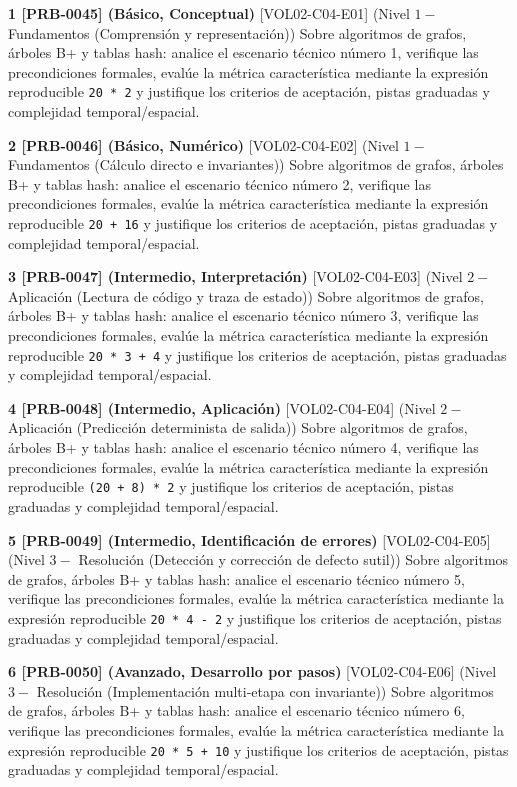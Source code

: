 \documentclass{book}
\begin{document}
\begin{tcolorbox}[title={Ejercicios}, studiumworked, breakable]

\noindent\textbf{1 [PRB-0045] (Básico, Conceptual)}
[VOL02-C04-E01] (Nivel \(1 -\) Fundamentos (Comprensión y representación)) Sobre algoritmos de grafos, árboles B+ y tablas hash: analice el escenario técnico número 1, verifique las precondiciones formales, evalúe la métrica característica mediante la expresión reproducible \texttt{20 * 2} y justifique los criterios de aceptación, pistas graduadas y complejidad temporal/espacial.

\noindent\textbf{2 [PRB-0046] (Básico, Numérico)}
[VOL02-C04-E02] (Nivel \(1 -\) Fundamentos (Cálculo directo e invariantes)) Sobre algoritmos de grafos, árboles B+ y tablas hash: analice el escenario técnico número 2, verifique las precondiciones formales, evalúe la métrica característica mediante la expresión reproducible \texttt{20 + 16} y justifique los criterios de aceptación, pistas graduadas y complejidad temporal/espacial.

\noindent\textbf{3 [PRB-0047] (Intermedio, Interpretación)}
[VOL02-C04-E03] (Nivel \(2 -\) Aplicación (Lectura de código y traza de estado)) Sobre algoritmos de grafos, árboles B+ y tablas hash: analice el escenario técnico número 3, verifique las precondiciones formales, evalúe la métrica característica mediante la expresión reproducible \texttt{20 * 3 + 4} y justifique los criterios de aceptación, pistas graduadas y complejidad temporal/espacial.

\noindent\textbf{4 [PRB-0048] (Intermedio, Aplicación)}
[VOL02-C04-E04] (Nivel \(2 -\) Aplicación (Predicción determinista de salida)) Sobre algoritmos de grafos, árboles B+ y tablas hash: analice el escenario técnico número 4, verifique las precondiciones formales, evalúe la métrica característica mediante la expresión reproducible \texttt{(20 + 8) * 2} y justifique los criterios de aceptación, pistas graduadas y complejidad temporal/espacial.

\noindent\textbf{5 [PRB-0049] (Intermedio, Identificación de errores)}
[VOL02-C04-E05] (Nivel \(3 -\) Resolución (Detección y corrección de defecto sutil)) Sobre algoritmos de grafos, árboles B+ y tablas hash: analice el escenario técnico número 5, verifique las precondiciones formales, evalúe la métrica característica mediante la expresión reproducible \texttt{20 * 4 - 2} y justifique los criterios de aceptación, pistas graduadas y complejidad temporal/espacial.

\noindent\textbf{6 [PRB-0050] (Avanzado, Desarrollo por pasos)}
[VOL02-C04-E06] (Nivel \(3 -\) Resolución (Implementación multi-etapa con invariante)) Sobre algoritmos de grafos, árboles B+ y tablas hash: analice el escenario técnico número 6, verifique las precondiciones formales, evalúe la métrica característica mediante la expresión reproducible \texttt{20 * 5 + 10} y justifique los criterios de aceptación, pistas graduadas y complejidad temporal/espacial.


\end{tcolorbox}
\end{document}
